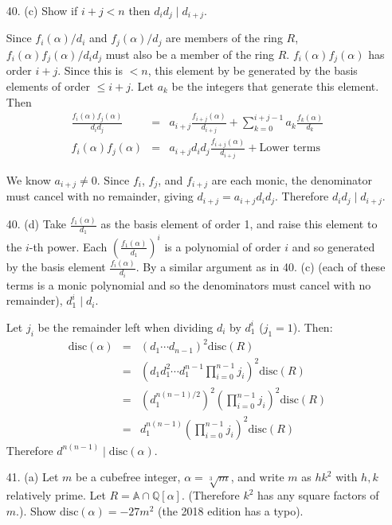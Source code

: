 \documentclass{article}
\newcommand{\Q}[0]{\mathbb{Q}}
\newcommand{\disc}[1]{\text{disc}(#1)}
\begin{document}
\begin{enumerate}
\item[40. (c)] Show if $i + j < n$ then $d_i d_j \mid d_{i+j}$.

Since $f_i(\alpha) / d_i$ and $f_j(\alpha) / d_j$ are members of the ring $R$, $f_i(\alpha)f_j(\alpha) / d_i d_j$ must also be a member of the ring $R$.  $f_i(\alpha)f_j(\alpha)$ has order $i + j$.  Since this is $< n$, this element by be generated by the basis elements of order $\le i + j$.  Let $a_{k}$ be the integers that generate this element.  Then
\begin{eqnarray*}
    \frac{f_i(\alpha)f_j(\alpha)}{d_i d_j} &=& a_{i+j}\frac{f_{i+j}(\alpha)}{d_{i+j}} + \sum_{k = 0}^{i + j - 1} a_k \frac{f_{k}(\alpha)}{d_k} \\
    f_i(\alpha)f_j(\alpha) &=& a_{i+j}d_{i}d_{j}\frac{f_{i+j}(\alpha)}{d_{i+j}} + \text{Lower terms}
\end{eqnarray*}

We know $a_{i+j} \neq 0$.  Since $f_i$, $f_j$, and $f_{i+j}$ are each monic, the denominator must cancel with no remainder, giving $d_{i+j} = a_{i+j} d_i d_j$.  Therefore $d_i d_j \mid d_{i+j}$.

\item[40. (d)] Take $\frac{f_1(\alpha)}{d_1}$ as the basis element of order 1, and raise this element to the $i$-th power.  Each $(\frac{f_1(\alpha)}{d_1})^i$ is a polynomial of order $i$ and so generated by the basis element $\frac{f_i(\alpha)}{d_i}$.  By a similar argument as in 40. (c) (each of these terms is a monic polynomial and so the denominators must cancel with no remainder), $d_1^i \mid d_i$.

Let $j_i$ be the remainder left when dividing $d_i$ by $d_1^i$ ($j_1 = 1$).  Then:
\begin{eqnarray*}
    \disc{\alpha} &=& (d_1 \cdots d_{n-1})^2 \disc{R} \\
                  &=& (d_1 d_1^2 \cdots d_1^{n-1} \prod_{i=0}^{n-1} j_i)^2 \disc{R} \\
                  &=& (d_1^{n(n-1)/2})^2 (\prod_{i=0}^{n-1} j_i)^2 \disc{R}\\
                  &=& d_1^{n(n-1)} (\prod_{i=0}^{n-1} j_i)^2 \disc{R}
\end{eqnarray*}
Therefore $d^{n(n-1)} \mid \disc{\alpha}$.

\item[41. (a)] Let $m$ be a cubefree integer, $\alpha = \sqrt[3]{m}$, and write $m$ as $hk^2$ with $h, k$ relatively prime.  Let $R = \mathbb{A} \cap \Q[\alpha]$.  (Therefore $k^2$ has any square factors of $m$.).  Show $\disc{\alpha} = -27m^2$ (the 2018 edition has a typo).


\end{enumerate}
\end{document}
